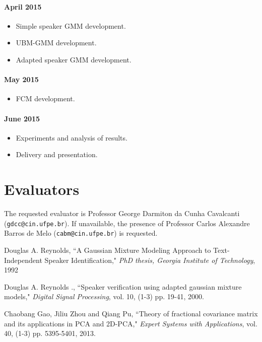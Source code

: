 \documentclass[a4paper,twocolumn]{article}
\begin{document}
\paragraph{\textbf{April 2015}}
\begin{itemize}[noitemsep]
    \item Simple speaker GMM development.
    \item UBM-GMM development.
    \item Adapted speaker GMM development.
\end{itemize}

\paragraph{\textbf{May 2015}}
\begin{itemize}[noitemsep]
    \item FCM development.
\end{itemize}

\paragraph{\textbf{June 2015}}
\begin{itemize}[noitemsep]
    \item Experiments and analysis of results.
    \item Delivery and presentation.
\end{itemize}


\section{Evaluators}
\label{sec:eval}

The requested evaluator is Professor George Darmiton da Cunha Cavalcanti (\texttt{gdcc@cin.ufpe.br}). If unavailable, the presence of Professor Carlos Alexandre Barros de Melo (\texttt{cabm@cin.ufpe.br}) is requested.


\begin{thebibliography}{9}
        Douglas A. Reynolds,
        ``A Gaussian Mixture Modeling Approach to Text-Independent Speaker Identification,"
        \textit{PhD thesis, Georgia Institute of Technology},
        1992

        Douglas A. Reynolds .,
        ``Speaker verification using adapted gaussian mixture models,"
        \textit{Digital Signal Processing}, vol. 10,
        (1-3) pp. 19-41,
        2000.

        Chaobang Gao, Jiliu Zhou and Qiang Pu,
        ``Theory of fractional covariance matrix and its applications in PCA and 2D-PCA,"
        \textit{Expert Systems with Applications}, vol. 40,
        (1-3) pp. 5395-5401,
        2013.
\end{thebibliography}
\end{document}
